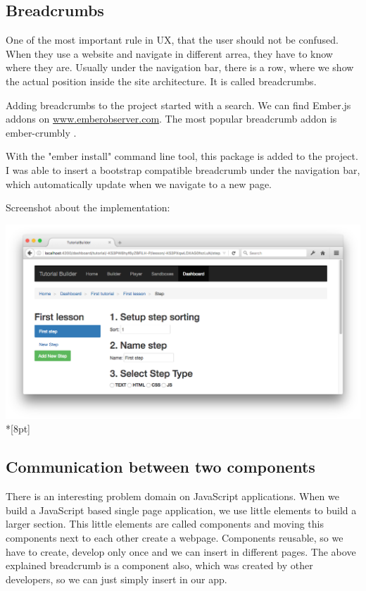 \documentclass[12pt, a4paper, oneside, openright, medskipamount]{report}
\begin{document}
\subsection{Breadcrumbs}

One of the most important rule in UX, that the user should not be confused. When they use a website and navigate in different arrea, they have to know where they are. Usually under the navigation bar, there is a row, where we show the actual position inside the site architecture. It is called breadcrumbs.

Adding breadcrumbs to the project started with a search. We can find Ember.js addons on \url{www.emberobserver.com}. The most popular breadcrumb addon is ember-crumbly \cite{ember-crumbly}.

With the "ember install" command line tool, this package is added to the project. I was able to insert a bootstrap compatible breadcrumb under the navigation bar, which automatically update when we navigate to a new page.

Screenshot about the implementation:

\includegraphics[width=1\textwidth]{assets/breadcrumb-screenshot.png}\\*[8pt]

\subsection{Communication between two components}

There is an interesting problem domain on JavaScript applications. When we build a JavaScript based single page application, we use little elements to build a larger section. This little elements are called components and moving this components next to each other create a webpage. Components reusable, so we have to create, develop only once and we can insert in different pages. The above explained breadcrumb is a component also, which was created by other developers, so we can just simply insert in our app.
\end{document}
